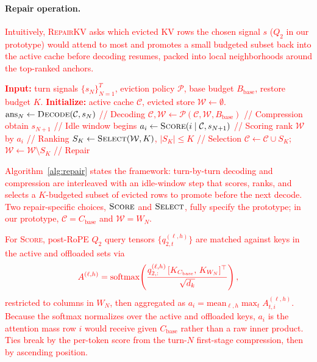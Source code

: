 \documentclass{article}
\newcommand{\repairkv}{\textsc{RepairKV}}
\newcommand{\bbase}{\ensuremath{B_{\mathrm{base}}}}
\begin{document}
\paragraph{Repair operation.}
\textcolor{red}{Intuitively, \repairkv{} asks which evicted KV rows the
chosen signal $s$ ($Q_2$ in our prototype) would attend to most and
promotes a small
budgeted subset back into the active cache before decoding resumes,
packed into local neighborhoods around the top-ranked anchors.}
\begin{algorithm}[t]
\caption{General \repairkv{} Execution Framework}
\label{alg:repair}
\begin{algorithmic}[1]
\STATE \textcolor{red}{\textbf{Input:} turn signals $\{s_N\}_{N=1}^T$,
\textcolor{red}{eviction} policy $\mathcal{P}$, base budget $\bbase$, restore
budget $K$.}
\STATE \textcolor{red}{\textbf{Initialize:} active cache $\mathcal{C}$,
evicted store $\mathcal{W}\!\gets\!\emptyset$.}
\FOR{\textcolor{red}{$N = 1$ to $T$}}
  \STATE \textcolor{red}{$\mathrm{ans}_N \gets \textsc{Decode}(\mathcal{C}, s_N)$} \hfill \textcolor{red}{// Decoding}
  \STATE \textcolor{red}{$\mathcal{C}, \mathcal{W} \gets \mathcal{P}(\mathcal{C}, \mathcal{W}, \bbase)$} \hfill \textcolor{red}{// Compression}
  \STATE \textcolor{red}{obtain $s_{N+1}$} \hfill \textcolor{red}{// Idle window begins}
    \STATE \textcolor{red}{$a_i \gets \textsc{Score}(i \mid \mathcal{C}, s_{N+1})$} \hfill \textcolor{red}{// Scoring}
  \ENDFOR
  \STATE \textcolor{red}{rank $\mathcal{W}$ by $a_i$} \hfill \textcolor{red}{// Ranking}
  \STATE \textcolor{red}{$S_K \gets \textsc{Select}(\mathcal{W}, K)$, $|S_K|\!\le\!K$} \hfill \textcolor{red}{// Selection}
  \STATE \textcolor{red}{$\mathcal{C} \gets \mathcal{C}\!\cup\!S_K$;\, $\mathcal{W} \gets \mathcal{W}\!\setminus\!S_K$} \hfill \textcolor{red}{// Repair}
\ENDFOR
\end{algorithmic}
\end{algorithm}
\textcolor{red}{Algorithm~\ref{alg:repair} states the framework:
turn-by-turn decoding and compression are interleaved with an
idle-window step that scores, ranks, and selects a $K$-budgeted subset
of evicted rows to promote before the next decode. Two
repair-specific choices, $\textsc{Score}$ and $\textsc{Select}$, fully
specify the prototype; in our prototype, $\mathcal{C} = C_{\mathrm{base}}$
and $\mathcal{W} = W_N$.}

\textcolor{red}{For \textsc{Score}, post-RoPE $Q_2$ query tensors
$\{q^{(\ell,h)}_{2,t}\}$ are matched against keys in the active and
offloaded sets via}
\begin{equation}
  \textcolor{red}{A^{(\ell,h)} = \mathrm{softmax}\!\left(
    \frac{q^{(\ell,h)}_{2,:}\, [K_{C_{\mathrm{base}}},\, K_{W_N}]^{\top}}
         {\sqrt{d_k}}
  \right),}
  \label{eq:score-attn}
\end{equation}
\textcolor{red}{restricted to columns in $W_N$, then aggregated as
$a_i = \mathrm{mean}_{\ell, h} \max_t A^{(\ell,h)}_{t,i}$.
Because the softmax normalizes over the active and offloaded keys,
$a_i$ is the attention mass row $i$ would receive given
$C_{\mathrm{base}}$ rather than a raw inner product. Ties break
by the per-token score from the turn-$N$ first-stage compression, then
by ascending position.}
\end{document}
